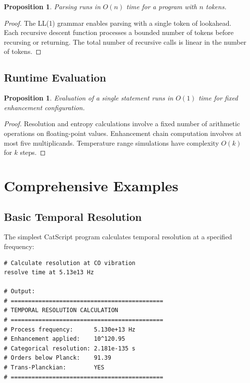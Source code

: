 \documentclass[twocolumn,10pt]{article}
\newtheorem{proposition}[theorem]{Proposition}
\begin{document}
\begin{proposition}
Parsing runs in $O(n)$ time for a program with $n$ tokens.
\end{proposition}

\begin{proof}
The LL(1) grammar enables parsing with a single token of lookahead. Each recursive descent function processes a bounded number of tokens before recursing or returning. The total number of recursive calls is linear in the number of tokens.
\end{proof}

\subsection{Runtime Evaluation}

\begin{proposition}
Evaluation of a single statement runs in $O(1)$ time for fixed enhancement configuration.
\end{proposition}

\begin{proof}
Resolution and entropy calculations involve a fixed number of arithmetic operations on floating-point values. Enhancement chain computation involves at most five multiplicands. Temperature range simulations have complexity $O(k)$ for $k$ steps.
\end{proof}

\section{Comprehensive Examples}
\label{sec:examples}

\subsection{Basic Temporal Resolution}

The simplest CatScript program calculates temporal resolution at a specified frequency:

\begin{lstlisting}[caption={Basic resolution calculation}]
# Calculate resolution at CO vibration
resolve time at 5.13e13 Hz

# Output:
# ============================================
# TEMPORAL RESOLUTION CALCULATION
# ============================================
# Process frequency:      5.130e+13 Hz
# Enhancement applied:    10^120.95
# Categorical resolution: 2.181e-135 s
# Orders below Planck:    91.39
# Trans-Planckian:        YES
# ============================================
\end{lstlisting}
\end{document}
